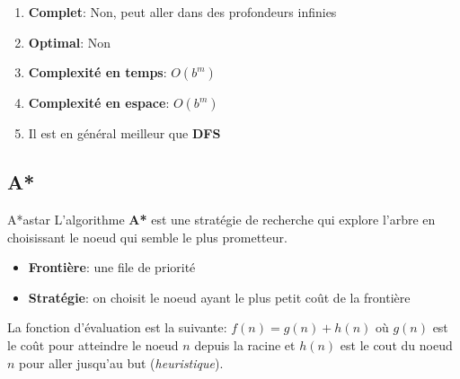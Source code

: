 \begin{remarks}\leavevmode
    \begin{enumerate}
        \item \textbf{Complet}: Non, peut aller dans des profondeurs infinies
        \item \textbf{Optimal}: Non
        \item \textbf{Complexité en temps}: $O(b^m)$
        \item \textbf{Complexité en espace}: $O(b^m)$
        \item Il est en général meilleur que \textbf{DFS}
    \end{enumerate}
\end{remarks}


\subsection{A*} %
\label{sub:a_}

\begin{definition}{A*}{astar}
    L'algorithme \textbf{A*} est une stratégie de recherche qui explore l'arbre en choisissant le noeud qui semble le plus prometteur.
    \begin{itemize}
        \item \textbf{Frontière}: une file de priorité
        \item \textbf{Stratégie}: on choisit le noeud ayant le plus petit coût de la frontière
    \end{itemize} 
    La fonction d'évaluation est la suivante: 
    \begin{math}
        f(n) = g(n) + h(n)
    \end{math} 
    où $g(n)$ est le coût pour atteindre le noeud $n$ depuis la racine et 
    $h(n)$ est le cout du noeud $n$ pour aller jusqu'au but (\textit{heuristique}).
\end{definition}

